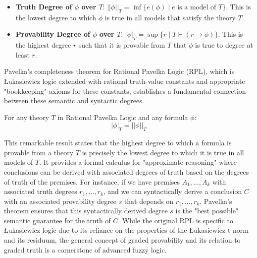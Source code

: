 \begin{itemize}
    \item \textbf{Truth Degree of $\phi$ over $T$}: $||\phi||_T = \inf\{e(\phi) \mid e \text{ is a model of } T\}$. This is the lowest degree to which $\phi$ is true in all models that satisfy the theory $T$.
    \item \textbf{Provability Degree of $\phi$ over $T$}: $|\phi|_T = \sup\{r \mid T \vdash (\bar{r} \rightarrow \phi)\}$. This is the highest degree $r$ such that it is provable from $T$ that $\phi$ is true to degree at least $r$.
\end{itemize}

Pavelka's completeness theorem for Rational Pavelka Logic (RPL), which is Łukasiewicz logic extended with rational truth-value constants and appropriate "bookkeeping" axioms for these constants, establishes a fundamental connection between these semantic and syntactic degrees.

\begin{theorem}
For any theory $T$ in Rational Pavelka Logic and any formula $\phi$:
\[ |\phi|_T = ||\phi||_T \]
\end{theorem}

This remarkable result states that the highest degree to which a formula is provable from a theory $T$ is precisely the lowest degree to which it is true in all models of $T$. It provides a formal calculus for "approximate reasoning" where conclusions can be derived with associated degrees of truth based on the degrees of truth of the premises. For instance, if we have premises $A_1, \dots, A_k$ with associated truth degrees $r_1, \dots, r_k$, and we can syntactically derive a conclusion $C$ with an associated provability degree $s$ that depends on $r_1, \dots, r_k$, Pavelka's theorem ensures that this syntactically derived degree $s$ is the "best possible" semantic guarantee for the truth of $C$. While the original RPL is specific to Łukasiewicz logic due to its reliance on the properties of the Łukasiewicz t-norm and its residuum, the general concept of graded provability and its relation to graded truth is a cornerstone of advanced fuzzy logic.